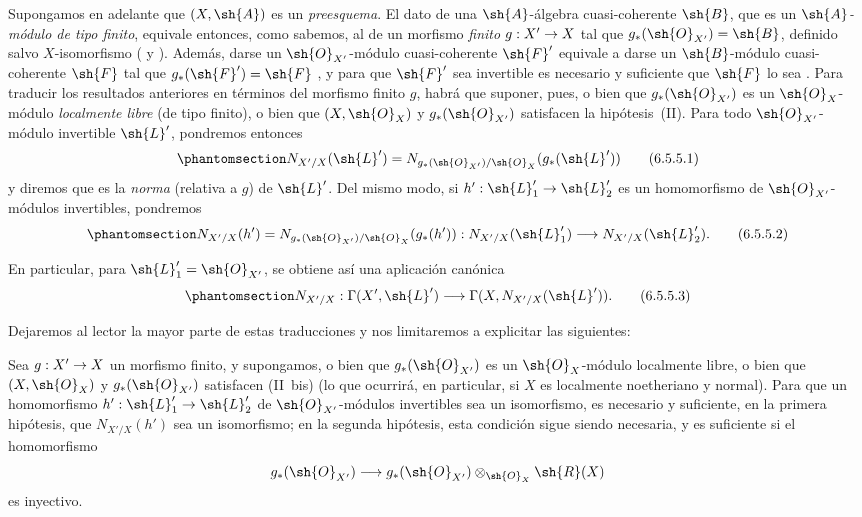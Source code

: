 \documentclass[oneside,10pt]{amsart}
\makeatletter
\newcommand{\ega@arrow}[2]{\mathchoice{#1}{#2}{#2}{#2}}
\renewcommand{\to}{\ega@arrow{\longrightarrow}{\rightarrow}}
\let\EGAOriginalLabel\label
\renewcommand{\label}[1]{\phantomsection\EGAOriginalLabel{#1}}
\makeatother
\begin{document}
\begin{env}[6.5.5]
\label{II.6.5.5}
Supongamos en adelante que $(X,\sh{A})$ es un \emph{preesquema}.
El dato de una $\sh{A}$-álgebra cuasi-coherente $\sh{B}$, que es un \emph{$\sh{A}$-módulo de tipo finito}, equivale entonces, como sabemos, al de un morfismo \emph{finito} $g:X'\to X$ tal que $g_*(\sh{O}_{X'})=\sh{B}$, definido salvo $X$-isomorfismo ( y ).
Además, darse un $\sh{O}_{X'}$-módulo cuasi-coherente $\sh{F}'$ equivale a darse un $\sh{B}$-módulo cuasi-coherente $\sh{F}$ tal que $g_*(\sh{F}')=\sh{F}$ , y para que $\sh{F}'$ sea invertible es necesario y suficiente que $\sh{F}$ lo sea .
Para traducir los resultados anteriores en términos del morfismo finito $g$, habrá que suponer, pues, o bien que $g_*(\sh{O}_{X'})$ es un $\sh{O}_X$-módulo \emph{localmente libre} (de tipo finito), o bien que $(X,\sh{O}_X)$ y $g_*(\sh{O}_{X'})$ satisfacen la hipótesis~(II).
Para todo $\sh{O}_{X'}$-módulo invertible $\sh{L}'$, pondremos entonces
\[
\label{II.6.5.5.1}
  N_{X'/X}(\sh{L}') =
  N_{g_*(\sh{O}_{X'})/\sh{O}_X}(g_*(\sh{L}'))
\tag{6.5.5.1}
\]
y diremos que es la \emph{norma} (relativa a $g$) de $\sh{L}'$.
Del mismo modo, si $h':\sh{L}'_1\to\sh{L}'_2$ es un homomorfismo de $\sh{O}_{X'}$-módulos invertibles, pondremos
\[
\label{II.6.5.5.2}
  N_{X'/X}(h') =
  N_{g_*(\sh{O}_{X'})/\sh{O}_X}(g_*(h')) :
  N_{X'/X}(\sh{L}'_1)\to N_{X'/X}(\sh{L}'_2).
\tag{6.5.5.2}
\]

En particular, para $\sh{L}'_1=\sh{O}_{X'}$, se obtiene así una aplicación canónica
\[
\label{II.6.5.5.3}
  N_{X'/X}:\Gamma(X',\sh{L}')\to
  \Gamma(X,N_{X'/X}(\sh{L}')).
\tag{6.5.5.3}
\]

Dejaremos al lector la mayor parte de estas traducciones y nos limitaremos a explicitar las siguientes:
\end{env}


\begin{proposition}[6.5.6]
\label{II.6.5.6}
Sea $g:X'\to X$ un morfismo finito, y supongamos, o bien que $g_*(\sh{O}_{X'})$ es un $\sh{O}_X$-módulo localmente libre, o bien que $(X,\sh{O}_X)$ y $g_*(\sh{O}_{X'})$ satisfacen \textup{(II~bis)} (lo que ocurrirá, en particular, si $X$ es localmente noetheriano y normal).
Para que un homomorfismo $h':\sh{L}'_1\to\sh{L}'_2$ de $\sh{O}_{X'}$-módulos invertibles sea un isomorfismo, es necesario y suficiente, en la primera hipótesis, que $N_{X'/X}(h')$ sea un isomorfismo;
en la segunda hipótesis, esta condición sigue siendo necesaria, y es suficiente si el homomorfismo
\[
  g_*(\sh{O}_{X'})\to
  g_*(\sh{O}_{X'})\otimes_{\sh{O}_X}\sh{R}(X)
\]
es inyectivo.
\end{proposition}
\end{document}
